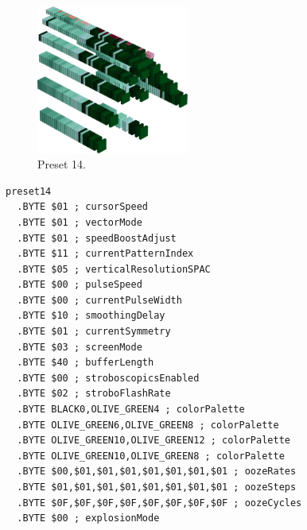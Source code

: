 \vspace*{-0.5cm}
\begin{minipage}[b]{0.48\linewidth}
\begin{figure}[H]                                                          
  \centering                                                             
  \begin{adjustbox}{width=5cm,center}                                   
  \includegraphics[width=5cm]{src/colorspace_presets/preset14-45.png}%
  \end{adjustbox}                                                        
\caption*{Preset 14.}                                           
\end{figure}                                                               
\end{minipage}
\hspace{0.1cm}
\begin{minipage}[b]{0.48\linewidth}                                                                         
\begin{lstlisting}[basicstyle=\ttfamily\tiny]
preset14
  .BYTE $01 ; cursorSpeed
  .BYTE $01 ; vectorMode
  .BYTE $01 ; speedBoostAdjust
  .BYTE $11 ; currentPatternIndex
  .BYTE $05 ; verticalResolutionSPAC
  .BYTE $00 ; pulseSpeed
  .BYTE $00 ; currentPulseWidth
  .BYTE $10 ; smoothingDelay
  .BYTE $01 ; currentSymmetry
  .BYTE $03 ; screenMode
  .BYTE $40 ; bufferLength
  .BYTE $00 ; stroboscopicsEnabled
  .BYTE $02 ; stroboFlashRate
  .BYTE BLACK0,OLIVE_GREEN4 ; colorPalette
  .BYTE OLIVE_GREEN6,OLIVE_GREEN8 ; colorPalette
  .BYTE OLIVE_GREEN10,OLIVE_GREEN12 ; colorPalette
  .BYTE OLIVE_GREEN10,OLIVE_GREEN8 ; colorPalette
  .BYTE $00,$01,$01,$01,$01,$01,$01,$01 ; oozeRates
  .BYTE $01,$01,$01,$01,$01,$01,$01,$01 ; oozeSteps
  .BYTE $0F,$0F,$0F,$0F,$0F,$0F,$0F,$0F ; oozeCycles
  .BYTE $00 ; explosionMode
\end{lstlisting}
\end{minipage}


